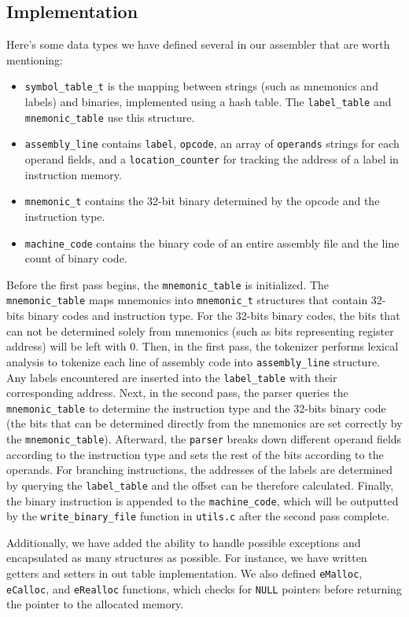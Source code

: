 \documentclass[11pt]{article}
\begin{document}
\subsection{Implementation}
\begin{flushleft}
Here's some data types we have defined several in our assembler that are worth mentioning:
\begin{itemize}
\item \texttt{symbol\_table\_t} is the mapping between strings (such as mnemonics and labels) and binaries, implemented using a hash table. The \texttt{label\_table} and \texttt{mnemonic\_table} use this structure.
\item \texttt{assembly\_line} contains \texttt{label}, \texttt{opcode}, an array of \texttt{operands} strings for each operand fields, and a \texttt{location\_counter} for tracking the address of a label in instruction memory.
\item \texttt{mnemonic\_t} contains the 32-bit binary determined by the opcode and the instruction type.
\item \texttt{machine\_code} contains the binary code of an entire assembly file and the line count of binary code.
\end{itemize}
Before the first pass begins, the \texttt{mnemonic\_table} is initialized. The \texttt{mnemonic\_table} maps mnemonics into \texttt {mnemonic\_t} structures that contain 32-bits binary codes and instruction type. For the 32-bits binary codes, the bits that can not be determined solely from mnemonics (such as bits representing register address) will be left with 0. Then, in the first pass, the tokenizer performs lexical analysis to tokenize each line of assembly code into \texttt{assembly\_line} structure. Any labels encountered are inserted into the \texttt{label\_table} with their corresponding address. Next, in the second pass, the parser queries the \texttt{mnemonic\_table} to determine the instruction type and the 32-bits binary code (the bits that can be determined directly from the mnemonics are set correctly by the \texttt{mnemonic\_table}). Afterward, the \texttt{parser} breaks down different operand fields according to the instruction type and sets the rest of the bits according to the operands. For branching instructions, the addresses of the labels are determined by querying the \texttt{label\_table} and the offset can be therefore calculated. Finally, the binary instruction is appended to the \texttt{machine\_code}, which will be outputted by the \texttt{write\_binary\_file} function in \texttt{utils.c} after the second pass complete.
\end{flushleft}
\begin{flushleft}
Additionally, we have added the ability to handle possible exceptions and encapsulated as many structures as possible. For instance, we have written getters and setters in out table implementation. We also defined \texttt{eMalloc}, \texttt{eCalloc}, and \texttt{eRealloc} functions, which checks for \texttt{NULL} pointers before returning the pointer to the allocated memory.
\end{flushleft}
\end{document}
